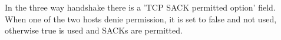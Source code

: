 In the three way handshake there is a 'TCP SACK permitted option'  field.\\
When one of the two hosts denie permission, it is set to false and not used, otherwise true is used and SACKs are permitted.